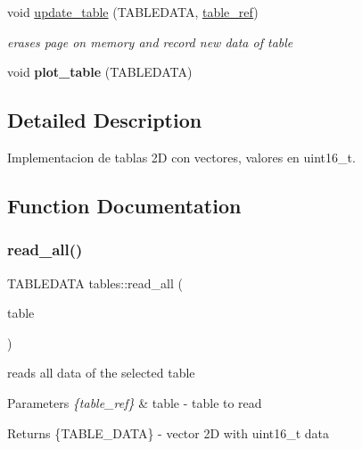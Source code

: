 \begin{DoxyCompactItemize}
\mbox{\label{namespacetables_a3a6244d3e384337d006dfb252768558a}} 
void \hyperlink{namespacetables_a3a6244d3e384337d006dfb252768558a}{update\+\_\+table} (T\+A\+B\+L\+E\+D\+A\+TA, \hyperlink{structtable__ref}{table\+\_\+ref})
\begin{DoxyCompactList}\small\item\em erases page on memory and record new data of table \end{DoxyCompactList}\item 
\mbox{\label{namespacetables_adaa52c49224ec8a6aac276310d27e702}} 
void {\bfseries plot\+\_\+table} (T\+A\+B\+L\+E\+D\+A\+TA)
\end{DoxyCompactItemize}


\subsection{Detailed Description}
Implementacion de tablas 2D con vectores, valores en uint16\+\_\+t. 

\subsection{Function Documentation}
\mbox{\label{namespacetables_a8a1bab94b65aabe4f2b226cdac58b41f}} 
\subsubsection{\texorpdfstring{read\+\_\+all()}{read\_all()}}
{\footnotesize\ttfamily T\+A\+B\+L\+E\+D\+A\+TA tables\+::read\+\_\+all (\begin{DoxyParamCaption}\item[{\hyperlink{structtable__ref}{table\+\_\+ref}}]{table }\end{DoxyParamCaption})}



reads all data of the selected table 


\begin{DoxyParams}{Parameters}
{\em \{table\+\_\+ref\}} & table -\/ table to read \\
\hline
\end{DoxyParams}
\begin{DoxyReturn}{Returns}
\{T\+A\+B\+L\+E\+\_\+\+D\+A\+TA\} -\/ vector 2D with uint16\+\_\+t data 
\end{DoxyReturn}
